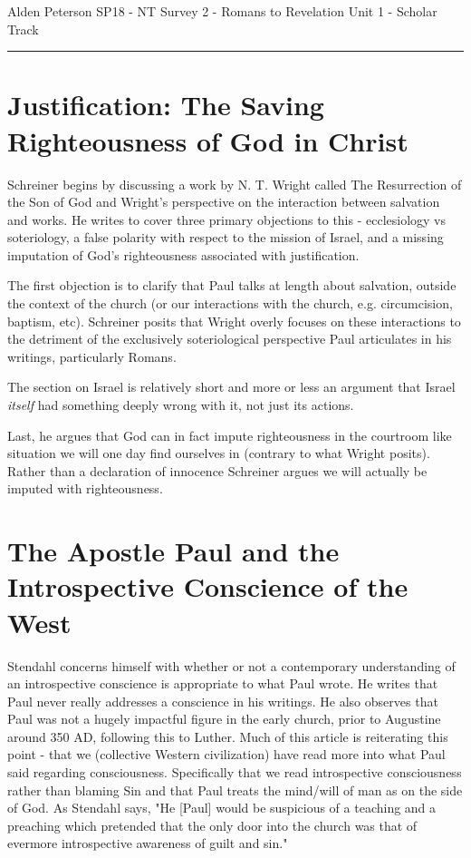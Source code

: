 \documentclass[12pt]{turabian-researchpaper}
\begin{document}
\begin{singlespace}
\noindent Alden Peterson \newline
\noindent SP18 - NT Survey 2 - Romans to Revelation\newline
\noindent Unit 1 - Scholar Track\newline
\noindent\rule{4cm}{0.4pt}
\end{singlespace}




\section{Justification: The Saving Righteousness of God in Christ\autocite{Shreiner2011}}

Schreiner begins by discussing a work by N. T. Wright called The Resurrection of the Son of God and Wright's perspective on the interaction between salvation and works. He writes to cover three primary objections to this - ecclesiology vs soteriology, a false polarity with respect to the mission of Israel, and a missing imputation of God's righteousness associated with justification.

The first objection is to clarify that Paul talks at length about salvation, outside the context of the church (or our interactions with the church, e.g. circumcision, baptism, etc). Schreiner posits that Wright overly focuses on these interactions to the detriment of the exclusively soteriological perspective Paul articulates in his writings, particularly Romans.

The section on Israel is relatively short and more or less an argument that Israel \textit{itself} had something deeply wrong with it, not just its actions.

Last, he argues that God can in fact impute righteousness in the courtroom like situation we will one day find ourselves in (contrary to what Wright posits). Rather than a declaration of innocence Schreiner argues we will actually be imputed with righteousness.


\section{The Apostle Paul and the Introspective Conscience of the West\autocite{Stendahl63}}

Stendahl concerns himself with whether or not a contemporary understanding of an introspective conscience is appropriate to what Paul wrote. He writes that Paul never really addresses a conscience in his writings. He also observes that Paul was not a hugely impactful figure in the early church, prior to Augustine around 350 AD, following this to Luther. Much of this article is reiterating this point - that we (collective Western civilization) have read more into what Paul said regarding consciousness. Specifically that we read introspective consciousness rather than blaming Sin and that Paul treats the mind/will of man as on the side of God. As Stendahl says, "He [Paul] would be suspicious of a teaching and a preaching which pretended that the only door into the church was that of evermore introspective awareness of guilt and sin."
\end{document}

